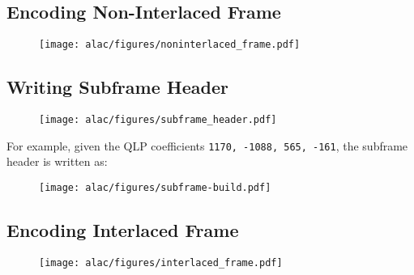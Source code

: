 \clearpage

\subsection{Encoding Non-Interlaced Frame}
\label{alac:write_non_interlaced_frame}
{
  
}
\begin{figure}[h]
  \texttt{[image: alac/figures/noninterlaced\_frame.pdf]}
\end{figure}

\clearpage

\subsection{Writing Subframe Header}
\label{alac:write_subframe_header}

\begin{figure}[h]
\texttt{[image: alac/figures/subframe\_header.pdf]}
\end{figure}
\par
\noindent
For example, given the QLP coefficients
\texttt{1170, -1088, 565, -161},
the subframe header is written as:
\begin{figure}[h]
\texttt{[image: alac/figures/subframe-build.pdf]}
\end{figure}

\clearpage

\subsection{Encoding Interlaced Frame}
\label{alac:write_interlaced_frame}
{
  
}

\clearpage

\begin{figure}[h]
  \texttt{[image: alac/figures/interlaced\_frame.pdf]}
\end{figure}

